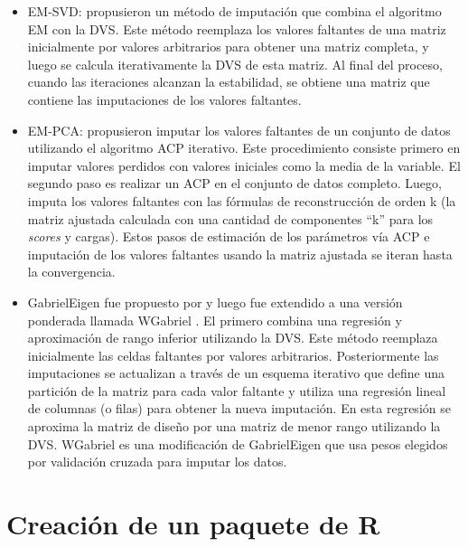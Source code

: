 \begin{itemize}
\item EM-SVD: \citet{Troyanskayaetal2001} propusieron un método de imputación que combina el algoritmo EM con la DVS. Este método reemplaza los valores faltantes de una matriz inicialmente por valores arbitrarios para obtener una matriz completa, y luego se calcula iterativamente la DVS de esta matriz. Al final del proceso, cuando las iteraciones alcanzan la estabilidad, se obtiene una matriz que contiene las imputaciones de los valores faltantes.
\end{itemize}

\begin{itemize}
\item EM-PCA: \citet{JosseHusson2016} propusieron imputar los valores faltantes de un conjunto de datos utilizando el algoritmo ACP iterativo. Este procedimiento consiste primero en imputar valores perdidos con valores iniciales como la media de la variable. El segundo paso es realizar un ACP en el conjunto de datos completo. Luego, imputa los valores faltantes con las fórmulas de reconstrucción de orden k (la matriz ajustada calculada con una cantidad de componentes ``k'' para los \emph{scores} y cargas). Estos pasos de estimación de los parámetros vía ACP e imputación de los valores faltantes usando la matriz ajustada se iteran hasta la convergencia. 
\end{itemize}

\begin{itemize}
\item GabrielEigen fue propuesto por \citet{Alarconetal2010} y luego fue extendido a una versión ponderada llamada WGabriel \citep{Alarconetal2014}. El primero combina una regresión y aproximación de rango inferior utilizando la DVS. Este método reemplaza inicialmente las celdas faltantes por valores arbitrarios. Posteriormente las imputaciones se actualizan a través de un esquema iterativo que define una partición de la matriz para cada valor faltante y utiliza una regresión lineal de columnas (o filas) para obtener la nueva imputación.  En esta regresión se aproxima la matriz de diseño por una matriz de menor rango utilizando la DVS. WGabriel es una modificación de GabrielEigen que usa pesos elegidos por validación cruzada para imputar los datos.
\end{itemize}

\section{Creación de un paquete de R}


